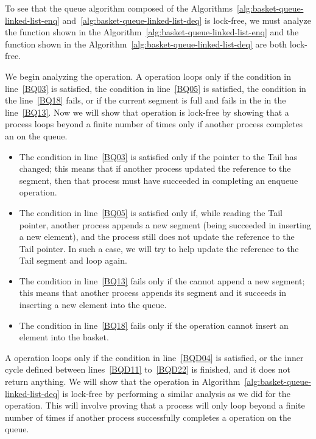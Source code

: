 \begin{proofT}
  To see that the queue algorithm composed of the Algorithms~\ref{alg:basket-queue-linked-list-enq} and~\ref{alg:basket-queue-linked-list-deq} is lock-free, we must analyze the \Enq function shown in the Algorithm~\ref{alg:basket-queue-linked-list-enq} and the \Deq function shown in the Algorithm~\ref{alg:basket-queue-linked-list-deq} are both lock-free.

  We begin analyzing the \Enq operation. A \Enq operation loops only if the condition in line~\ref{BQ03} is satisfied, the condition in line~\ref{BQ05} is satisfied, the condition in the line~\ref{BQ18} fails, or if the current segment is full and fails in the \CAS in the line~\ref{BQ13}. Now we will show that \Enq operation is lock-free by showing that a process loops beyond a finite number of times only if another process completes an \Enq on the queue.

  \begin{itemize}
    \item The condition in line~\ref{BQ03} is satisfied only if the pointer to the Tail has changed; this means that if another process updated the reference to the segment, then that process must have succeeded in completing an enqueue operation.
    \item The condition in line~\ref{BQ05} is satisfied only if, while reading the Tail pointer, another process appends a new segment (being succeeded in inserting a new element), and the process still does not update the reference to the Tail pointer. In such a case, we will try to help update the reference to the Tail segment and loop again.
    \item The condition in line~\ref{BQ13} fails only if the \CAS cannot append a new segment; this means that another process appends its segment and it succeeds in inserting a new element into the queue.
    \item The condition in line~\ref{BQ18} fails only if the operation cannot insert an element into the basket.
  \end{itemize}

  A \Deq operation loops only if the condition in line~\ref{BQD04} is satisfied, or the inner cycle defined between lines~\ref{BQD11} to~\ref{BQD22} is finished, and it does not return anything. We will show that the \Deq operation in Algorithm~\ref{alg:basket-queue-linked-list-deq} is lock-free by performing a similar analysis as we did for the \Enq operation. This will involve proving that a process will only loop beyond a finite number of times if another process successfully completes a \Deq operation on the queue.


\end{proofT}
